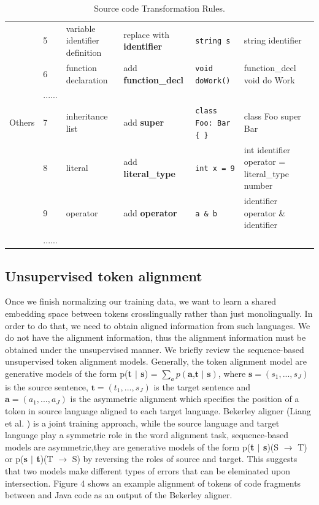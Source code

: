 \begin{table}
{\begin{tabular}{p{2cm}|p{0.7cm}|p{2cm}|p{3cm}|p{4cm}|p{4cm}}
		&5& variable identifier definition & replace with \textbf{identifier} & \texttt{string s}& string identifier\\\cline{2-6}

		&6& function declaration & add \textbf{function\_decl} & \texttt{void doWork()}& function\_decl void do Work \\\cline{2-6}
		&......&&&& \\\cline{2-6}
		\hline
		Others &7& inheritance list & add \textbf{super} & \texttt{class Foo: Bar \{ \}} & class Foo super Bar\\\cline{2-6}
		
		&8& literal & add \textbf{literal\_type} & \texttt{int x = 9}& int identifier operator = literal\_type number \\\cline{2-6}
		
		&9& operator & add \textbf{operator} & \texttt{a \& b }&  identifier operator \& identifier \\\cline{2-6}
		&......&&&& \\\cline{2-6}
	
	
		\hline
	\end{tabular}}
	\medskip
	\caption{Source code Transformation Rules.}
\end{table}
\subsection{ Unsupervised token alignment}

Once we finish normalizing our training data, we want to learn a shared embedding space between tokens crosslingually rather than just monolingually. In order to do that, we need to obtain aligned information from such languages. We do not have the alignment information, thus the alignment information must be obtained under the unsupervised manner. We briefly review the sequence-based unsupervised token alignment models. Generally, the token alignment model are generative models of the form p(\textbf{t $|$ s}) = $\displaystyle\sum_{a} p(\textbf{a,t $|$ s})$, where $\textbf{s} = (s_{1},..., s_{J})$ is the source sentence, $\textbf{t} = (t_{1},..., s_{J})$ is the target sentence and $\textbf{a} = (a_{1},..., a_{J})$ is the asymmetric alignment which specifies the position of a token in source language aligned to each target language. Bekerley aligner (Liang et al. \cite{liang2006alignment}) is a joint training approach, while the source language and target language play a symmetric role in the word alignment task, sequence-based models are asymmetric,they are generative models of the form p(\textbf{t $|$ s})(S $\rightarrow$ T) or p(\textbf{s $|$ t})(T $\rightarrow$ S) by reversing the roles of source and target. This suggests that two models make different types of errors that can be eleminated upon intersection. Figure 4 shows an example alignment of tokens of code fragments between  and Java code as an output of the Bekerley aligner.


